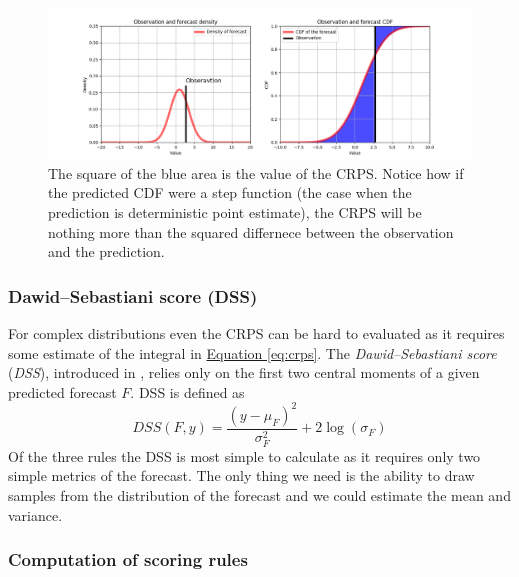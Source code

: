 \documentclass[12pt,a4paper,twoside]{scrartcl}
\numberwithin{equation}{section}
\renewcommand*{\refeq}[1]{\hyperref[#1]{Equation \ref*{#1}}}
\begin{document}
\begin{center}
  \begin{figure}[htbp]
    \label{fig:crps}
    \centering
    \includegraphics[height=0.5\textwidth, width=1\textwidth]{figures/crps.png}
    \caption[Continuous Rank Probability Score Intuition]{The square of the blue area is the value of the CRPS. Notice how if the predicted CDF were a step function (the case when the prediction is deterministic point estimate), the CRPS will be nothing more than the squared differnece between the observation and the prediction.}
  \end{figure}
\end{center}

\subsubsection{Dawid–Sebastiani score (DSS)}
\label{sec:dss}

For complex distributions even the CRPS can be hard to evaluated as it requires some estimate of the integral in \refeq{eq:crps}. The \emph{Dawid–Sebastiani score} (\emph{DSS}), introduced in \cite{dawid1999}, relies only on the first two central moments of a given predicted forecast \(F\). DSS is defined as
\begin{equation}
  DSS(F,y) =  \frac{(y-\mu_F)^2}{\sigma_F^2}+2\log(\sigma_F)
\end{equation}
Of the three rules the DSS is most simple to calculate as it requires only two simple metrics of the forecast. The only thing we need is the ability to draw samples from the distribution of the forecast and we could estimate the mean and variance.
\subsubsection{Computation of scoring rules}
\label{sec:eval-rules}
\end{document}
